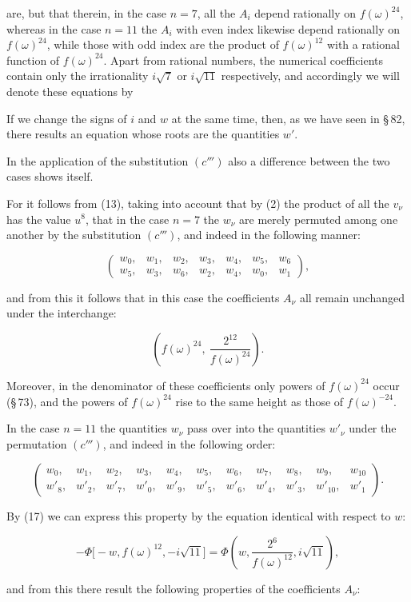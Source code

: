 are, but that therein, in the case $n = 7$, all the $A_i$ depend rationally on $f(\omega)^{24}$, whereas in the case $n = 11$ the $A_i$ with even index likewise depend rationally on $f(\omega)^{24}$, while those with odd index are the product of $f(\omega)^{12}$ with a rational function of $f(\omega)^{24}$. Apart from rational numbers, the numerical coefficients contain only the irrationality $i\sqrt{7}$ or $i\sqrt{11}$ respectively, and accordingly we will denote these equations by


If we change the signs of $i$ and $w$ at the same time, then, as we have seen in \S\,82, there results an equation whose roots are the quantities $w'$.

In the application of the substitution $(c''')$ also a difference between the two cases shows itself.

For it follows from (13), taking into account that by (2) the product of all the $v_\nu$ has the value $u^8$, that in the case $n = 7$ the $w_\nu$ are merely permuted among one another by the substitution $(c''')$, and indeed in the following manner:

\[
\begin{pmatrix} w_0, & w_1, & w_2, & w_3, & w_4, & w_5, & w_6\\ w_5, & w_3, & w_6, & w_2, & w_4, & w_0, & w_1 \end{pmatrix},
\]

and from this it follows that in this case the coefficients $A_\nu$ all remain unchanged under the interchange:

\[
\left(f(\omega)^{24},\ \frac{2^{12}}{f(\omega)^{24}}\right).
\]

Moreover, in the denominator of these coefficients only powers of $f(\omega)^{24}$ occur (\S\,73), and the powers of $f(\omega)^{24}$ rise to the same height as those of $f(\omega)^{-24}$.

In the case $n = 11$ the quantities $w_\nu$ pass over into the quantities $w'_\nu$ under the permutation $(c''')$, and indeed in the following order:

\[
\begin{pmatrix} w_0, & w_1, & w_2, & w_3, & w_4, & w_5, & w_6, & w_7, & w_8, & w_9, & w_{10}\\ w'_8, & w'_2, & w'_7, & w'_0, & w'_9, & w'_5, & w'_6, & w'_4, & w'_3, & w'_{10}, & w'_1 \end{pmatrix}.
\]

By (17) we can express this property by the equation identical with respect to $w$:

\[
-\Phi\bigl[-w, f(\omega)^{12}, -i\sqrt{11}\bigr] = \Phi\!\left(w, \frac{2^6}{f(\omega)^{12}}, i\sqrt{11}\right),
\]

and from this there result the following properties of the coefficients $A_\nu$:
